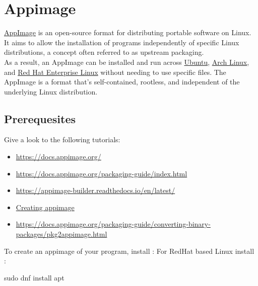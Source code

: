 \newpage
\newcommand{\abuild}{\bftt{appimage-builder}}
\newcommand{\pbuild}{\bftt{pkg2appimage}}

\section{Appimage}

\href{https://appimage.org/}{AppImage} is an open-source format for distributing portable software on Linux.  
It aims to allow the installation of programs independently of specific Linux distributions, a concept often referred to as upstream packaging. \\
As a result, an AppImage can be installed and run across \href{https://ubuntu.com}{Ubuntu}, \href{https://archlinux.org}{Arch Linux}, and \href{https://www.redhat.com}{Red Hat Enterprise Linux} without needing to use specific files. 
The AppImage is a format that's self-contained, rootless, and independent of the underlying Linux distribution. 

\subsection{Prerequesites}

Give a look to the following tutorials:
\begin{itemize}
\item \href{https://docs.appimage.org/}{https://docs.appimage.org/}
\item \href{https://docs.appimage.org/packaging-guide/index.html}{https://docs.appimage.org/packaging-guide/index.html}
\item \href{https://appimage-builder.readthedocs.io/en/latest/}{https://appimage-builder.readthedocs.io/en/latest/}
\item \href{https://github.com/AppImage/AppImageKit/wiki/Creating-AppImages/cc2441518975caca23e9ce2dba6f08a22c678d1e}{Creating appimage}
\item \href{https://docs.appimage.org/packaging-guide/converting-binary-packages/pkg2appimage.html}{https://docs.appimage.org/packaging-guide/converting-binary-packages/pkg2appimage.html}
\end{itemize}
\vspace{0.25cm}
To create an appimage of your program, install \abuild:
{}
For RedHat based Linux install :
\begin{script}
\fprompt{~} sudo dnf install apt
\end{script}
\newpage
